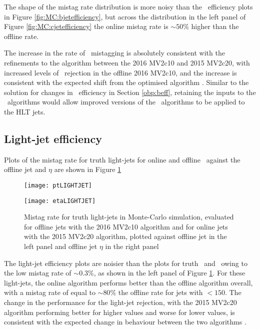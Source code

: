 		The shape of the mistag rate distribution is more noisy than the \bjet\ efficiency plots in Figure \ref{fig:MC:bjetefficiency}, but across the \pt distribution in the left panel of Figure \ref{fig:MC:cjetefficiency} the online mistag rate is $\sim50\%$ higher than the offline rate.

		The increase in the rate of \cjet\, mistagging is absolutely consistent with the refinements to the algorithm between the 2016 MV2c10 and 2015 MV2c20, with increased levels of \cjet\, rejection in the offline 2016 MV2c10, and the increase is consistent with the expected shift from the optimised algorithm \cite{btagOptimisation}. Similar to the solution for changes in \btag\ efficiency in Section \ref{obp:beff}, retaining the inputs to the \btag\ algorithms would allow improved versions of the \btag\ algorithms to be applied to the HLT jets.

	\subsection{Light-jet efficiency}

		Plots of the mistag rate for truth light-jets for online and offline \btag\ against the offline jet \pt and $\eta$ are shown in Figure \ref{fig:MC:lightjetefficiency}

		\begin{figure}[h]
			\centering
			\begin{minipage}[h]{0.48\linewidth}
				\texttt{[image: ptLIGHTJET]}

			\end{minipage}
			\quad
			\begin{minipage}[h]{0.48\linewidth}
				\texttt{[image: etaLIGHTJET]}
			\end{minipage}
			\caption[Comparison of mistag rate between online and offline truth light-jets in Monte-Carlo simulation]{Mistag rate for truth light-jets in Monte-Carlo simulation, evaluated for offline jets with the 2016 MV2c10 algorithm and for online jets with the 2015 MV2c20 algorithm, plotted against offline jet \pt in the left panel and offline jet $\eta$ in the right panel}
			\label{fig:MC:lightjetefficiency}
		\end{figure}

		The light-jet efficiency plots are noisier than the plots for truth \bjets\ and \cjets\ owing to the low mistag rate of $\sim0.3\%$, as shown in the left panel of Figure \ref{fig:MC:lightjetefficiency}. For these light-jets, the online algorithm performs better than the offline algorithm overall, with a mistag rate of equal to $\sim80\%$ the offline rate for jets with \pt$<150$. The change in the performance for the light-jet rejection, with the 2015 MV2c20 algorithm performing better for higher \pt values and worse for lower \pt values, is consistent with the expected change in behaviour between the two algorithms \cite{btagOptimisation}.


